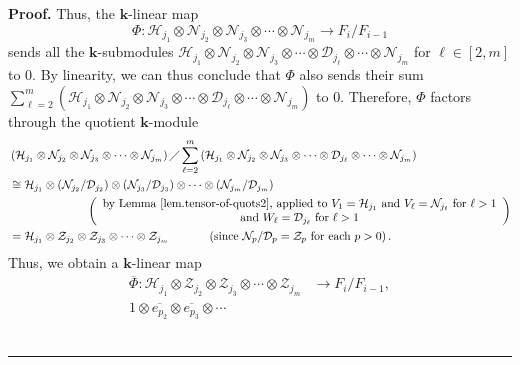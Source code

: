 \documentclass[numbers=enddot,12pt,final,onecolumn,notitlepage]{scrartcl}%
\theoremstyle{definition}
\newenvironment{proof}[1][Proof]{\noindent\textbf{#1.} }{\ \rule{0.5em}{0.5em}}
\let\sumnonlimits\sum
\renewcommand{\sum}{\sumnonlimits\limits}
\begin{document}
\begin{proof}
Thus, the $\mathbf{k}$-linear map%
\[
\Phi:\mathcal{H}_{j_{1}}\otimes\mathcal{N}_{j_{2}}\otimes\mathcal{N}_{j_{3}%
}\otimes\cdots\otimes\mathcal{N}_{j_{m}}\rightarrow F_{i}/F_{i-1}%
\]
sends all the $\mathbf{k}$-submodules $\mathcal{H}_{j_{1}}\otimes
\mathcal{N}_{j_{2}}\otimes\mathcal{N}_{j_{3}}\otimes\cdots\otimes
\mathcal{D}_{j_{\ell}}\otimes\cdots\otimes\mathcal{N}_{j_{m}}$ for $\ell
\in\left[  2,m\right]  $ to $0$. By linearity, we can thus conclude that
$\Phi$ also sends their sum \newline$\sum_{\ell=2}^{m}\left(  \mathcal{H}%
_{j_{1}}\otimes\mathcal{N}_{j_{2}}\otimes\mathcal{N}_{j_{3}}\otimes
\cdots\otimes\mathcal{D}_{j_{\ell}}\otimes\cdots\otimes\mathcal{N}_{j_{m}%
}\right)  $ to $0$. Therefore, $\Phi$ factors through the quotient
$\mathbf{k}$-module%
\begin{align*}
&  \left(  \mathcal{H}_{j_{1}}\otimes\mathcal{N}_{j_{2}}\otimes\mathcal{N}%
_{j_{3}}\otimes\cdots\otimes\mathcal{N}_{j_{m}}\right)  \diagup\sum_{\ell
=2}^{m}\left(  \mathcal{H}_{j_{1}}\otimes\mathcal{N}_{j_{2}}\otimes
\mathcal{N}_{j_{3}}\otimes\cdots\otimes\mathcal{D}_{j_{\ell}}\otimes
\cdots\otimes\mathcal{N}_{j_{m}}\right) \\
&  \cong\mathcal{H}_{j_{1}}\otimes\left(  \mathcal{N}_{j_{2}}/\mathcal{D}%
_{j_{2}}\right)  \otimes\left(  \mathcal{N}_{j_{3}}/\mathcal{D}_{j_{3}%
}\right)  \otimes\cdots\otimes\left(  \mathcal{N}_{j_{m}}/\mathcal{D}_{j_{m}%
}\right) \\
&  \ \ \ \ \ \ \ \ \ \ \ \ \ \ \ \ \ \ \ \ \left(
\begin{array}
[c]{c}%
\text{by Lemma \ref{lem.tensor-of-quots2}, applied to }V_{1}=\mathcal{H}%
_{j_{1}}\text{ and }V_{\ell}=\mathcal{N}_{j_{\ell}}\text{ for }\ell>1\\
\text{and }W_{\ell}=\mathcal{D}_{j_{\ell}}\text{ for }\ell>1
\end{array}
\right) \\
&  =\mathcal{H}_{j_{1}}\otimes\mathcal{Z}_{j_{2}}\otimes\mathcal{Z}_{j_{3}%
}\otimes\cdots\otimes\mathcal{Z}_{j_{m}}\ \ \ \ \ \ \ \ \ \ \left(
\text{since }\mathcal{N}_{p}/\mathcal{D}_{p}=\mathcal{Z}_{p}\text{ for each
}p>0\right)  .
\end{align*}
Thus, we obtain a $\mathbf{k}$-linear map%
\begin{align*}
\overline{\Phi}:\mathcal{H}_{j_{1}}\otimes\mathcal{Z}_{j_{2}}\otimes
\mathcal{Z}_{j_{3}}\otimes\cdots\otimes\mathcal{Z}_{j_{m}}  &  \rightarrow
F_{i}/F_{i-1},\\
1\otimes\overline{e_{p_{2}}}\otimes\overline{e_{p_{3}}}\otimes\cdots

\end{align*}
\end{proof}
\end{document}
